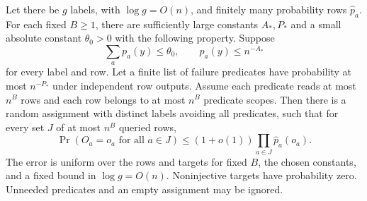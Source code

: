 \begin{lemma}\label{lem:clock-sampling}
Let there be \(g\) labels, with \(\log g=O(n)\), and finitely many
probability rows \(\widehat p_a\). For each fixed \(B\ge1\), there are
sufficiently large constants \(A_*,P_*\) and a small absolute constant
\(\theta_0>0\) with the following property. Suppose
\[
 \sum_a p_a(y)\le\theta_0,\qquad p_a(y)\le n^{-A_*}
\]
for every label and row. Let a finite list of failure predicates have
probability at most \(n^{-P_*}\) under independent row outputs. Assume
each predicate reads at most \(n^B\) rows and each row belongs to at most
\(n^B\) predicate scopes. Then there is a random assignment with distinct
labels avoiding all predicates, such that for every set \(J\) of at most
\(n^B\) queried rows,
\[
 \Pr(O_a=o_a\text{ for all }a\in J)
       \le(1+o(1))\prod_{a\in J}\widehat p_a(o_a).
\]
The error is uniform over the rows and targets for fixed \(B\), the chosen
constants, and a fixed bound in \(\log g=O(n)\). Noninjective targets
have probability zero. Unneeded predicates and an empty assignment may
be ignored.
\end{lemma}


